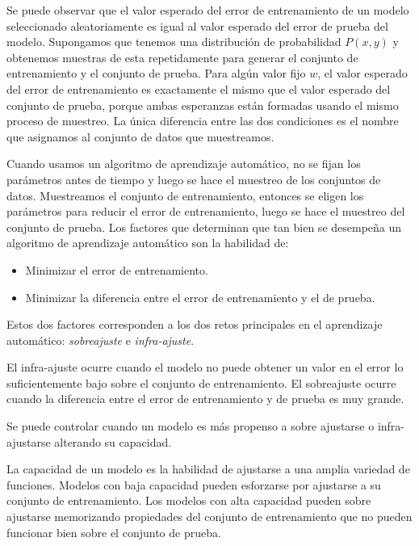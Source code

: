 Se puede observar que el valor esperado del error de entrenamiento de un
modelo seleccionado aleatoriamente es igual al valor esperado del error
de prueba del modelo. Supongamos que tenemos una distribución de
probabilidad $P(x, y)$ y obtenemos muestras de esta repetidamente para
generar el conjunto de entrenamiento y el conjunto de prueba. Para algún
valor fijo $w$, el valor esperado del error de entrenamiento es
exactamente el mismo que el valor esperado del conjunto de prueba,
porque ambas esperanzas están formadas usando el mismo proceso de
muestreo. La única diferencia entre las dos condiciones es el nombre que
asignamos al conjunto de datos que muestreamos.

Cuando usamos un algoritmo de aprendizaje automático, no
se fijan los parámetros antes de tiempo y luego se hace el muestreo de
los conjuntos de datos. Muestreamos el conjunto de entrenamiento,
entonces se eligen los parámetros para reducir el error de
entrenamiento, luego se hace el muestreo del conjunto de prueba. Los
factores que determinan que tan bien se desempeña un algoritmo de
aprendizaje automático son la habilidad de:

\begin{itemize}
    \item Minimizar el error de entrenamiento.
    \item Minimizar la diferencia entre el error de entrenamiento y el de prueba.
\end{itemize}



Estos dos factores corresponden a los dos retos principales en el
aprendizaje automático: \textit{sobreajuste} e \textit{infra-ajuste}.\\ 

\begin{remark}
El infra-ajuste
ocurre cuando el modelo no puede obtener un valor en el error lo
suficientemente bajo sobre el conjunto de entrenamiento. El sobreajuste
ocurre cuando la diferencia entre el error de entrenamiento y de prueba
es muy grande.
\end{remark}


Se puede controlar cuando un modelo es más propenso a sobre ajustarse o
infra-ajustarse alterando su capacidad.\\

\begin{remark}
La capacidad de un
modelo es la habilidad de ajustarse a una amplia variedad de funciones.
Modelos con baja capacidad pueden esforzarse por ajustarse a su conjunto
de entrenamiento. Los modelos con alta capacidad pueden sobre ajustarse
memorizando propiedades del conjunto de entrenamiento que no pueden
funcionar bien sobre el conjunto de prueba.
\end{remark}


